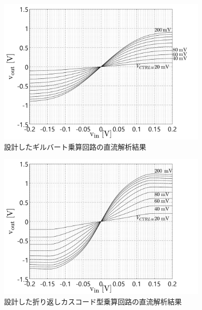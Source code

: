         \begin{figure}[!b]
            \centering
            \includegraphics[width=0.9\textwidth]{figures/chapter3/previous_dc_com.pdf}
            \caption{設計したギルバート乗算回路の直流解析結果}
            \label{fig:3_previous_dc_com}
        \end{figure}
        \begin{figure}[!b]
            \centering
            \includegraphics[width=0.9\textwidth]{figures/chapter3/folded_mirror_dc_com.pdf}
            \caption{設計した折り返しカスコード型乗算回路の直流解析結果}
            \label{fig:3_folded_mirror_dc_com}
        \end{figure}
